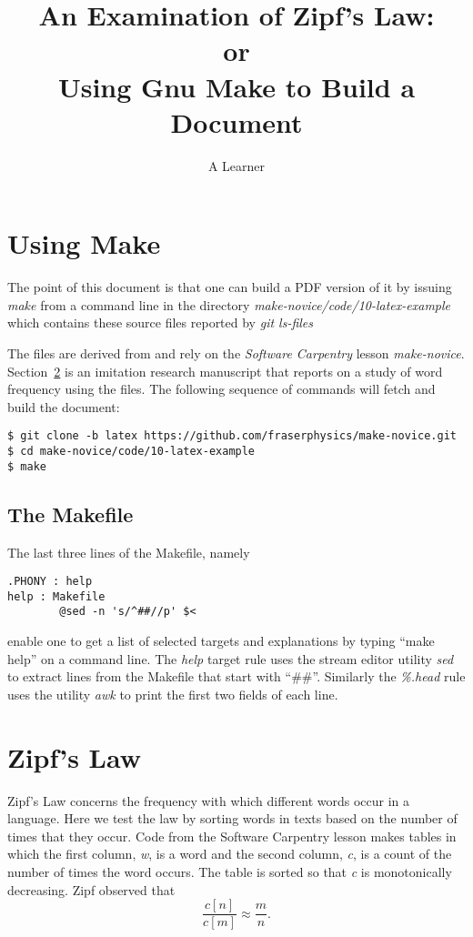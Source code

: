 \documentclass[10pt]{article}
\title{An Examination of Zipf's Law:\\ or\\ Using Gnu Make to Build a
  Document}
\author{A Learner}
\begin{document}
\maketitle

\section{Using Make}
\label{sec:make}

The point of this document is that one can build a PDF version of it
by issuing \emph{make} from a command line in the directory
\emph{make-novice/code/10-latex-example} which contains these
source files reported by \emph{git ls-files}
%

%
The files are derived from and rely on the \emph{Software
  Carpentry}\cite{software-carpentry} lesson \emph{make-novice}.
Section~\ref{sec:zipf} is an imitation research manuscript that
reports on a study of word frequency using the files.  The following
sequence of commands will fetch and build the document:
\begin{verbatim}
$ git clone -b latex https://github.com/fraserphysics/make-novice.git
$ cd make-novice/code/10-latex-example
$ make
\end{verbatim}

\subsection{The Makefile}
\label{sec:makefile}

The last three lines of the Makefile, namely
\begin{verbatim}
.PHONY : help
help : Makefile
        @sed -n 's/^##//p' $<
\end{verbatim}
enable one to get a list of selected targets and explanations by
typing ``make help'' on a command line.  The \emph{help} target rule
uses the stream editor utility \emph{sed} to extract lines from the
Makefile that start with ``\#\#''.  Similarly the \emph{\%.head} rule
uses the utility \emph{awk} to print the first two fields of each
line.

\section{Zipf's Law}
\label{sec:zipf}

Zipf's Law\cite{Zipf} concerns the frequency with which different
words occur in a language.  Here we test the law by sorting words in
texts based on the number of times that they occur.  Code from the
Software Carpentry lesson makes tables in which the first column,
\emph{w}, is a word and the second column, \emph{c}, is a count of the
number of times the word occurs.  The table is sorted so that \emph{c}
is monotonically decreasing.  Zipf observed that
\begin{equation*}
  \frac{c[n]}{c[m]} \approx \frac{m}{n}.
\end{equation*}
\end{document}
